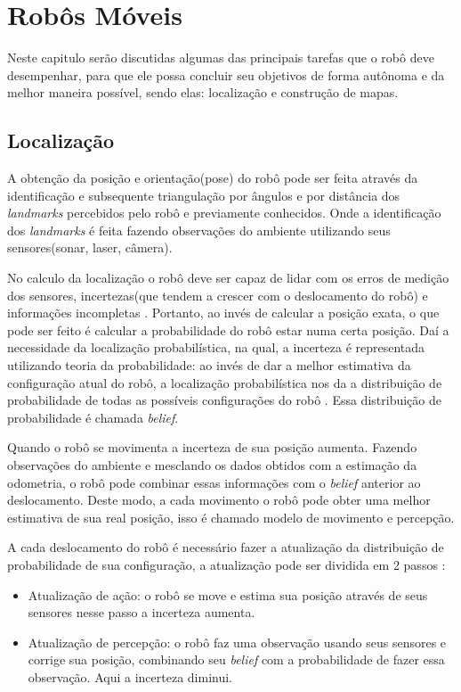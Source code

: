 \chapter{Robôs Móveis}
\label{robosMoveis}

  Neste capitulo serão discutidas algumas das principais tarefas que o robô deve desempenhar,
  para que ele possa concluir seu objetivos de forma autônoma e da melhor maneira possível, sendo elas: localização e construção de mapas.
  
\section{Localização}
A obtenção da posição e orientação(pose) do robô pode ser feita através da identificação e 
subsequente triangulação por ângulos e por distância dos \textit{landmarks} percebidos pelo robô e
 previamente conhecidos. Onde a identificação dos \textit{landmarks} 
 é feita fazendo observações do ambiente utilizando seus sensores(sonar, laser, câmera).
 
 No calculo da localização o robô deve ser capaz de lidar com os erros de medição dos sensores, 
 incertezas(que tendem a crescer com o deslocamento do robô) 
 e informações incompletas \cite{localization1}.  Portanto, ao invés de calcular a posição exata, 
 o que pode ser feito é calcular a probabilidade do robô estar numa certa posição. Daí a necessidade da 
 localização probabilística, na qual, a incerteza é representada utilizando teoria da probabilidade: 
 ao invés de dar a melhor estimativa da configuração atual do robô, 
 a localização probabilística nos da a distribuição de probabilidade de todas as possíveis 
 configurações do robô \cite{localization1}. Essa distribuição de probabilidade é chamada \textit{belief}.
 
 Quando o robô se movimenta a incerteza de sua posição aumenta. 
 Fazendo observações do ambiente e mesclando os dados obtidos com a estimação da odometria, 
 o robô pode combinar essas informações com o \textit{belief} anterior ao deslocamento. 
 Deste modo, a cada movimento o robô pode
 obter uma melhor estimativa de sua real posição, isso é chamado modelo de movimento e percepção.
 
 A cada deslocamento do robô é necessário fazer a atualização da distribuição de probabilidade de sua configuração, 
 a atualização pode ser dividida em 2 passos \cite{localization1}:
 \begin{itemize}
  \item Atualização de ação: o robô se move e estima sua posição através de seus sensores nesse passo a incerteza aumenta.
  \item Atualização de percepção: o robô faz uma observação usando seus sensores e corrige sua posição, 
  combinando seu \textit{belief} com a probabilidade de fazer essa observação.
  Aqui a incerteza diminui.
 \end{itemize}

